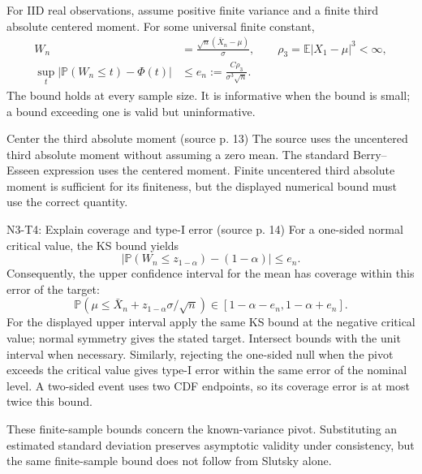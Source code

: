 \documentclass[12pt]{article}
\newcommand{\E}{\mathbb E}
\newcommand{\Prob}{\mathbb P}
\begin{document}
For IID real observations, assume positive finite variance and a finite
third absolute centered moment. For some universal finite constant,
\begin{align}
 W_n&=\frac{\sqrt n(\bar X_n-\mu)}{\sigma},\qquad
 \rho_3=\E|X_1-\mu|^3<\infty,\\
 \sup_t|\Prob(W_n\le t)-\Phi(t)|
 &\le e_n:=\frac{C\rho_3}{\sigma^3\sqrt n}.
\end{align}
The bound holds at every sample size. It is informative when the bound is
small; a bound exceeding one is valid but uninformative.
\begin{correctionbox}{Center the third absolute moment (source p. 13)}
The source uses the uncentered third absolute moment without assuming a
zero mean. The standard Berry--Esseen expression uses the centered moment.
Finite uncentered third absolute moment is sufficient for its finiteness,
but the displayed numerical bound must use the correct quantity.
\end{correctionbox}

\begin{todobox}{N3-T4: Explain coverage and type-I error (source p. 14)}
For a one-sided normal critical value, the KS bound yields
\begin{equation}
 |\Prob(W_n\le z_{1-\alpha})-(1-\alpha)|\le e_n.
\end{equation}
Consequently, the upper confidence interval for the mean has coverage
within this error of the target:
\begin{equation}
 \Prob\!\left(\mu\le\bar X_n+z_{1-\alpha}\sigma/\sqrt n\right)
 \in[1-\alpha-e_n,1-\alpha+e_n].
\end{equation}
For the displayed upper interval apply the same KS bound at the negative
critical value; normal symmetry gives the stated target. Intersect bounds
with the unit interval when necessary. Similarly, rejecting the one-sided
null when the pivot exceeds the critical value gives type-I error within
the same error of the nominal level. A two-sided event uses two CDF
endpoints, so its coverage error is at most twice this bound.

These finite-sample bounds concern the known-variance pivot. Substituting
an estimated standard deviation preserves asymptotic validity under
consistency, but the same finite-sample bound does not follow from Slutsky
alone.
\end{todobox}
\end{document}
